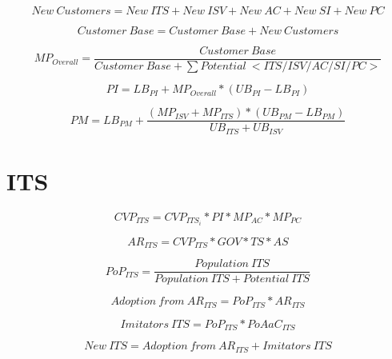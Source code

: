 \begin{equation}
	\mathit{New~Customers} = \mathit{New~ITS} + \mathit{New~ISV} + \mathit{New~AC} + \mathit{New~SI} + \mathit{New~PC}
\end{equation}

\begin{equation}
	\mathit{Customer~Base} = \mathit{Customer~Base} + \mathit{New~Customers}
\end{equation}

\begin{equation}
	MP_{Overall} = \frac{\mathit{Customer~Base}}{\mathit{Customer~Base} + \sum \mathit{Potential~<ITS/ISV/AC/SI/PC>}}
\end{equation}

\begin{equation}
	PI = LB_{PI} + MP_{Overall} * (UB_{PI} - LB_{PI})
\end{equation}

\begin{equation}
	PM = LB_{PM} + \frac{(MP_{ISV} + MP_{ITS}) * (UB_{PM} - LB_{PM})}{UB_{ITS} + UB_{ISV}}
\end{equation}


\newpage
\section{ITS}

\begin{equation}
		CVP_{ITS} =  CVP_{ITS_{i}} * PI * MP_{AC} * MP_{PC}
\end{equation}

\begin{equation}
		AR_{ITS} = CVP_{ITS} * GOV * TS * AS		
\end{equation}

\begin{equation}
	PoP_{ITS} = \frac{\mathit{Population~ITS}}{\mathit{Population~ITS}+\mathit{Potential~ITS}}
\end{equation}

\begin{equation}
	\mathit{Adoption~from~AR_{ITS}} = PoP_{ITS} * AR_{ITS}
\end{equation}

\begin{equation}
	\mathit{Imitators~ITS} = PoP_{ITS} * PoAaC_{ITS}
\end{equation}

\begin{equation}
	\mathit{New~ITS} = \mathit{Adoption~from~AR_{ITS}} + \mathit{Imitators~ITS}
\end{equation}

